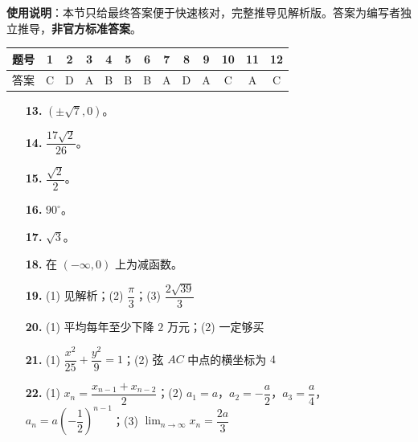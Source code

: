 
\begin{gknotice}
\textbf{使用说明}：本节只给最终答案便于快速核对，完整推导见解析版。答案为编写者独立推导，\textbf{非官方标准答案}。
\end{gknotice}

\begin{center}\begin{tabular}{ccccccccccccc}
\toprule
题号 & 1 & 2 & 3 & 4 & 5 & 6 & 7 & 8 & 9 & 10 & 11 & 12 \\
\midrule
答案 & C & D & A & B & B & B & A & D & A & C & A & C \\
\bottomrule
\end{tabular}\end{center}

\begin{itemize}[leftmargin=2.6em]
  \item[\textbf{13.}] $(\pm\sqrt7,0)$。
  \item[\textbf{14.}] $\dfrac{17\sqrt2}{26}$。
  \item[\textbf{15.}] $\dfrac{\sqrt2}{2}$。
  \item[\textbf{16.}] $90^\circ$。
\end{itemize}

\begin{itemize}[leftmargin=2.6em]
  \item[\textbf{17.}] $\sqrt3$。
  \item[\textbf{18.}] 在 $(-\infty,0)$ 上为减函数。
  \item[\textbf{19.}] (1) 见解析；(2) $\dfrac\pi3$；(3) $\dfrac{2\sqrt{39}}3$
  \item[\textbf{20.}] (1) 平均每年至少下降 $2$ 万元；(2) 一定够买
  \item[\textbf{21.}] (1) $\dfrac{x^2}{25}+\dfrac{y^2}{9}=1$；(2) 弦 $AC$ 中点的横坐标为 $4$
  \item[\textbf{22.}] (1) $x_n=\dfrac{x_{n-1}+x_{n-2}}2$；(2) $a_1=a$，$a_2=-\dfrac a2$，$a_3=\dfrac a4$，$a_n=a\left(-\dfrac12\right)^{n-1}$；(3) $\displaystyle\lim_{n\to\infty}x_n=\dfrac{2a}{3}$
\end{itemize}
